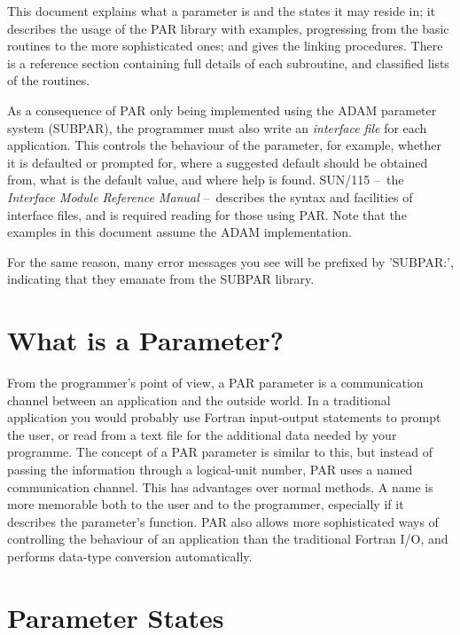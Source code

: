 \documentclass[twoside,11pt]{article}
\newcommand{\xref}[3]{#1}
\newcommand{\xlabel}[1]{}
\newcommand{\dash}{--}
\newcommand{\dash}{-}
\begin{document}
This document explains what a parameter is and the states it may reside
in; it describes the usage of the PAR library with examples, progressing
from the basic routines to the more sophisticated ones; and gives the
linking procedures.  There is a reference section containing full
details of each subroutine, and classified lists of the routines. 

As a consequence of PAR only being implemented using the {\footnotesize
ADAM} parameter system (SUBPAR), the programmer must also write an {\it
interface file} for each application.  This controls the behaviour of
the parameter, for example, whether it is defaulted or prompted for,
where a suggested default should be obtained from, what is the default
value, and where help is found.  
\xref{SUN/115}{sun115}{} \dash\ the {\it Interface Module
Reference Manual\/} \dash\ describes the syntax and facilities of interface
files, and is required reading for those using PAR.  Note that the 
examples in this document assume the {\footnotesize ADAM} implementation.

For the same reason, many error messages you see will be prefixed by 'SUBPAR:',
indicating that they emanate from the SUBPAR library.

\section{\xlabel{what_is_a_parameter}What is a Parameter?}

From the programmer's point of view, a PAR parameter is a communication
channel between an application and the outside world.  In a traditional
application you would probably use Fortran input-output statements to
prompt the user, or read from a text file for the additional data needed
by your programme.  The concept of a PAR parameter is similar to this,
but instead of passing the information through a logical-unit number,
PAR uses a named communication channel.  This has advantages over normal
methods.  A name is more memorable both to the user and to the
programmer, especially if it describes the parameter's function.  PAR
also allows more sophisticated ways of controlling the behaviour of an
application than the traditional Fortran I/O, and performs data-type
conversion automatically.

\section{\xlabel{parameter_states_}Parameter States} \label{se:states} 
\end{document}
